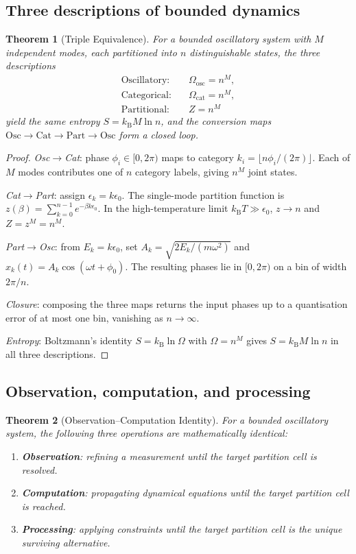 \documentclass[twocolumn,10pt,a4paper]{article}
\theoremstyle{thmstyle}
\newtheorem{theorem}{Theorem}[section]
\theoremstyle{definition}
\theoremstyle{remark}
\newcommand{\kB}{k_{\mathrm{B}}}
\begin{document}
\subsection{Three descriptions of bounded dynamics}

\begin{theorem}[Triple Equivalence]
\label{thm:triple}
For a bounded oscillatory system with $M$ independent modes, each
partitioned into $n$ distinguishable states, the three descriptions
\begin{align*}
\text{Oscillatory}:&\quad \Omega_{\mathrm{osc}}=n^{M},\\
\text{Categorical}:&\quad \Omega_{\mathrm{cat}}=n^{M},\\
\text{Partitional}:&\quad Z=n^{M}
\end{align*}
yield the same entropy $S=\kB M\ln n$, and the conversion maps
$\mathrm{Osc}\to\mathrm{Cat}\to\mathrm{Part}\to\mathrm{Osc}$ form a
closed loop.
\end{theorem}

\begin{proof}
\emph{Osc$\to$Cat}: phase $\phi_{i}\in[0,2\pi)$ maps to category
$k_{i}=\lfloor n\phi_{i}/(2\pi)\rfloor$. Each of $M$ modes contributes
one of $n$ category labels, giving $n^{M}$ joint states.

\emph{Cat$\to$Part}: assign $\epsilon_{k}=k\epsilon_{0}$. The
single-mode partition function is
$z(\beta)=\sum_{k=0}^{n-1}e^{-\beta k\epsilon_{0}}$. In the
high-temperature limit $\kB T\gg\epsilon_{0}$, $z\to n$ and
$Z=z^{M}=n^{M}$.

\emph{Part$\to$Osc}: from $E_{k}=k\epsilon_{0}$, set
$A_{k}=\sqrt{2E_{k}/(m\omega^{2})}$ and
$x_{k}(t)=A_{k}\cos(\omega t+\phi_{0})$. The resulting phases lie in
$[0,2\pi)$ on a bin of width $2\pi/n$.

\emph{Closure}: composing the three maps returns the input phases up
to a quantisation error of at most one bin, vanishing as $n\to\infty$.

\emph{Entropy}: Boltzmann's identity $S=\kB\ln\Omega$ with
$\Omega=n^{M}$ gives $S=\kB M\ln n$ in all three descriptions.
\end{proof}

\subsection{Observation, computation, and processing}

\begin{theorem}[Observation--Computation Identity]
\label{thm:obscomp}
For a bounded oscillatory system, the following three operations are
mathematically identical:
\begin{enumerate}[leftmargin=*,itemsep=0.1em]
\item \textbf{Observation}: refining a measurement until the target
partition cell is resolved.
\item \textbf{Computation}: propagating dynamical equations until the
target partition cell is reached.
\item \textbf{Processing}: applying constraints until the target
partition cell is the unique surviving alternative.
\end{enumerate}
\end{theorem}
\end{document}
